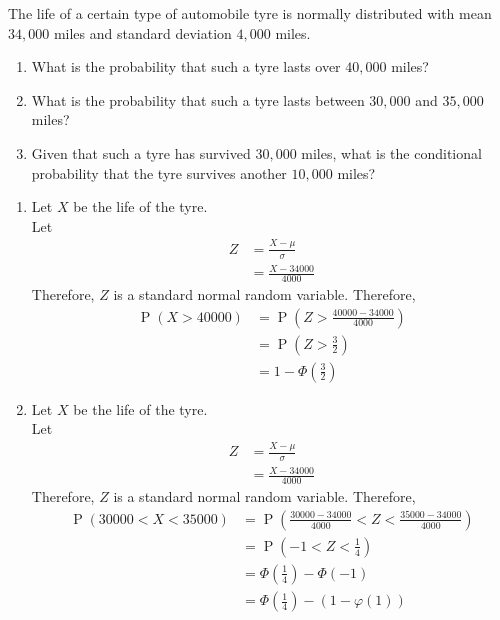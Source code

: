 \documentclass[fleqn, a4paper, 11pt, oneside]{amsart}
\theoremstyle{definition}
\theoremstyle{theorem}
\DeclareMathOperator{\prob}{\mathrm{P}}
\begin{document}
\begin{question}
	The life of a certain type of automobile tyre is normally distributed with mean $34,000$ miles and standard deviation $4,000$ miles.
	\begin{enumerate}
		\item What is the probability that such a tyre lasts over $40,000$ miles?
		\item What is the probability that such a tyre lasts between $30,000$ and $35,000$ miles?
		\item Given that such a tyre has survived $30,000$ miles, what is the conditional probability that the tyre survives another $10,000$ miles?
	\end{enumerate}
\end{question}

\begin{solution}
	\begin{enumerate}[leftmargin=*]
		\item
			Let $X$ be the life of the tyre.\\
			Let
			\begin{align*}
				Z &= \frac{X - \mu}{\sigma}\\
				&= \frac{X - 34000}{4000}
			\end{align*}
			Therefore, $Z$ is a standard normal random variable.
			Therefore,
			\begin{align*}
				\prob(X > 40000) &= \prob\left( Z > \frac{40000 - 34000}{4000} \right)\\
				&= \prob\left( Z > \frac{3}{2} \right)\\
				&= 1 - \Phi\left( \frac{3}{2} \right)
			\end{align*}
		\item
			Let $X$ be the life of the tyre.\\
			Let
			\begin{align*}
				Z &= \frac{X - \mu}{\sigma}\\
				&= \frac{X - 34000}{4000}
			\end{align*}
			Therefore, $Z$ is a standard normal random variable.
			Therefore,
			\begin{align*}
				\prob(30000 < X < 35000) &= \prob\left( \frac{30000 - 34000}{4000} < Z < \frac{35000 - 34000}{4000} \right)\\
				&= \prob\left( -1 < Z < \frac{1}{4} \right)\\
				&= \Phi\left( \frac{1}{4} \right) - \Phi(-1)\\
				&= \Phi\left( \frac{1}{4} \right) - \left( 1 - \varphi(1) \right)\\

\end{align*}
\end{enumerate}
\end{solution}
\end{document}
